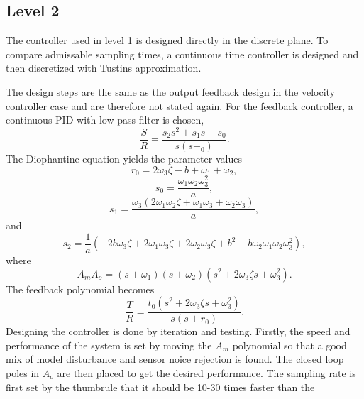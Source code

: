 \documentclass[12pt,a4paper]{article}
\begin{document}
\subsection*{Level 2}
The controller used in level 1 is designed directly in the discrete plane. To
compare admissable sampling times, a continuous time controller is designed and
then discretized with Tustins approximation. \par
The design steps are the same as the output feedback design in the velocity
controller case and are therefore not stated again. For the feedback controller,
a continuous PID with low pass filter is chosen,
\begin{equation}
    \label{eq:contpid}
    \frac{S}{R} = \frac{s_2 s^2 + s_1 s + s_0}{s(s+_0)}.
\end{equation}
The Diophantine equation yields the parameter values
\begin{equation}
    \label{eq:r0pos}
    r_0 = 2\omega_3 \zeta - b + \omega_1 + \omega_2, 
\end{equation}
\begin{equation}
    \label{eq:s0pos}
    s_0 = \frac{\omega_1 \omega_2 \omega_3^2}{a},
\end{equation}
\begin{equation}
    \label{eq:s1pos}
    s_1 = \frac{\omega_3 (2\omega_1 \omega_2 \zeta + \omega_1 \omega_3 +
    \omega_2 \omega_3)}{a},
\end{equation}
and
\begin{equation}
    \label{eq:s2pos}
    s_2 = \frac{1}{a} ( -2b\omega_3 \zeta + 2\omega_1 \omega_3 \zeta + 2\omega_2
    \omega_3 \zeta + b^2 - b\omega_2 \omega_1 \omega_2 \omega_3^2),
\end{equation}
where
\begin{equation}
    \label{eq:contpoles}
    A_m A_{o} = (s + \omega_1)(s + \omega_2)(s^2 + 2\omega_3\zeta s +
    \omega_3^2).
\end{equation}
The feedback polynomial becomes
\begin{equation}
    \label{eq:cont_feedback}
    \frac{T}{R} = \frac{t_0 (s^2 + 2\omega_3\zeta s + \omega_3^2)}{s(s + r_0)}.
\end{equation}
Designing the controller is done by iteration and testing. Firstly, the speed
and performance of the system is set by moving the $A_m$ polynomial so that a
good mix of model disturbance and sensor noice rejection is found. The closed
loop poles in $A_o$ are then placed to get the desired performance. The sampling
rate is first set by the thumbrule that it should be 10-30 times faster than the
\end{document}

